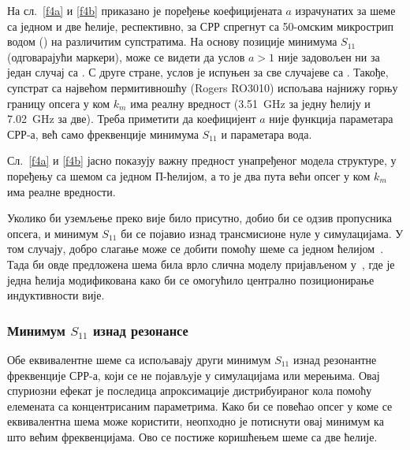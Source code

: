 \documentclass[main.tex]{subfiles}
\begin{document}
На сл.~\ref{f4a} и \ref{f4b} приказано је поређење коефицијената $a$ израчунатих за шеме са једном и две ћелије, респективно, за СРР спрегнут са 50-омским микрострип водом () на различитим супстратима. На основу позиције минимума $S_{11}$ (одговарајући маркери), може се видети да услов $a>1$ није задовољен ни за један случај са . С друге стране, услов је испуњен за све случајеве са . Такође, супстрат са највећом пермитивношћу (Rogers RO3010) испољава најнижу горњу границу опсега у ком $k_m$ има реалну вредност (\SI{3.51}{\giga\hertz} за једну ћелију и \SI{7.02}{\giga\hertz} за две). Треба приметити да коефицијент $a$ није функција параметара СРР-а, већ само фреквенције минимума $S_{11}$ и параметара вода.

Сл.~\ref{f4a} и \ref{f4b} јасно показују важну предност унапређеног модела структуре, у поређењу са шемом са једном П-ћелијом, а то је два пута већи опсег у ком $k_m$ има реалне вредности.

Уколико би уземљење преко вије било присутно, добио би се одзив пропусника опсега, и минимум $S_{11}$ би се појавио изнад трансмисионе нуле у симулацијама. У том случају, добро слагање може се добити помоћу шеме са једном ћелијом~\cite{bib16}. Тада би овде предложена шема била врло слична моделу пријављеном у~\cite{aznar_improved}, где је једна ћелија модификована како би се омогућило централно позиционирање индуктивности вије.

\subsubsection{Минимум $S_{11}$ изнад резонансе}

Обе еквивалентне шеме са  испољавају други минимум $S_{11}$ изнад резонантне фреквенције СРР-а, који се не појављује у симулацијама или мерењима. Овај спуриозни ефекат је последица апроксимације дистрибуираног кола помоћу елемената са концентрисаним параметрима. Како би се повећао опсег у коме се еквивалентна шема може користити, неопходно је потиснути овај минимум ка што већим фреквенцијама. Ово се постиже коришћењем шеме са две ћелије.
\end{document}
